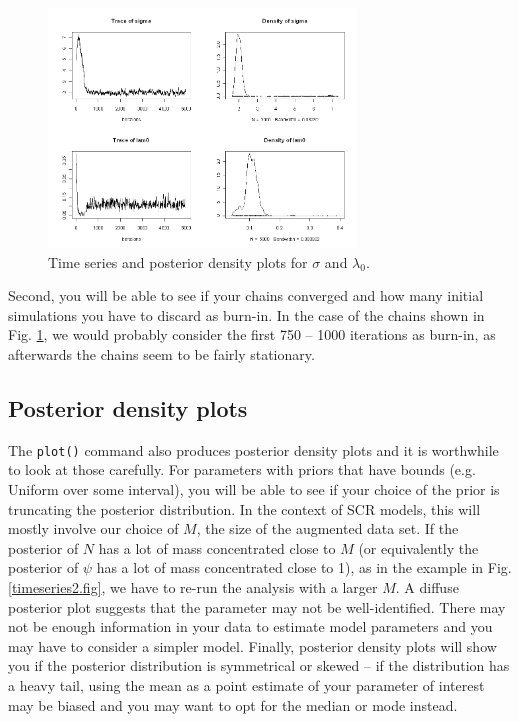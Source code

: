 \begin{figure}
\begin{center}
\includegraphics[height=2.5in]{Ch7/figs/timeseries}
\end{center}
\caption{Time series and posterior density plots for $\sigma$ and $\lambda_0$.}
\label{mcmc.fig.timeseries}
\end{figure}


Second, you will be able to see if your chains converged and how many initial simulations you have to discard as burn-in. In the case of the chains shown in Fig. \ref{mcmc.fig.timeseries}, we would probably consider the first 750 -- 1000 iterations as burn-in, as afterwards the chains seem to be fairly stationary.

\subsection{Posterior density plots}
The \verb#plot()# command also produces posterior density plots and it is worthwhile to look at those carefully. For parameters with priors that have bounds (e.g. Uniform over some interval), you will be able to see if your choice of the prior is truncating the posterior distribution. In the context of SCR models, this will mostly involve our choice of $M$, the size of the augmented data set. If the posterior of $N$ has a lot of mass concentrated close to $M$ (or equivalently the posterior of $\psi$ has a lot of mass concentrated close to 1), as in the example in Fig. \ref{timeseries2.fig}, we have to re-run the analysis with a larger $M$.  A diffuse
posterior plot suggests
that the parameter may not be well-identified. 
There may not be enough information in your data to estimate model parameters and you may have to consider a simpler model. Finally, posterior density plots will show you if the posterior distribution is symmetrical or skewed -- if the distribution has a heavy tail, using the mean as a point estimate of your parameter of interest may be biased and you may want to opt for the median or mode instead.

